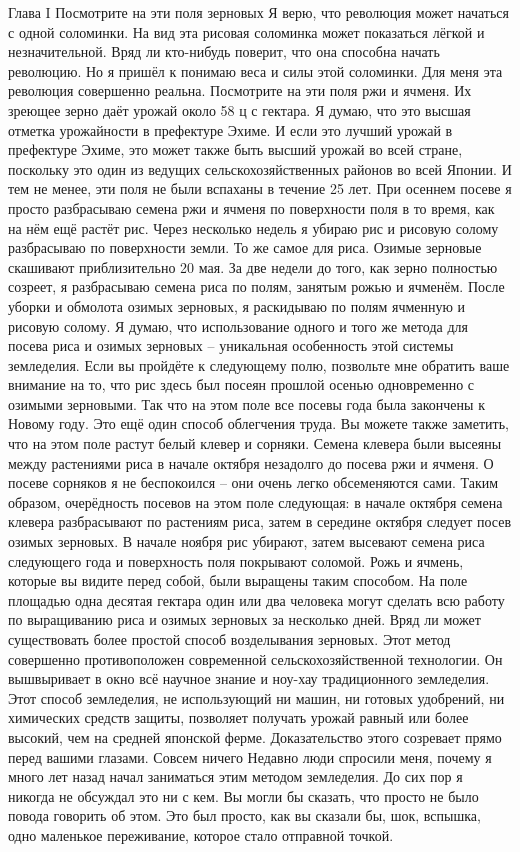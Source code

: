 \documentclass[a4paper]{book}
\begin{document}
Глава I Посмотрите на эти поля зерновых
Я верю, что революция может начаться с одной соломинки. На вид эта рисовая
соломинка может показаться лёгкой и незначительной. Вряд ли кто-нибудь поверит, что она
способна начать революцию. Но я пришёл к понимаю веса и силы этой соломинки. Для меня
эта революция совершенно реальна.
Посмотрите на эти поля ржи и ячменя. Их зреющее зерно даёт урожай около 58 ц с
гектара. Я думаю, что это высшая отметка урожайности в префектуре Эхиме. И если это
лучший урожай в префектуре Эхиме, это может также быть высший урожай во всей стране,
поскольку это один из ведущих сельскохозяйственных районов во всей Японии. И тем не
менее, эти поля не были вспаханы в течение 25 лет.
При осеннем посеве я просто разбрасываю семена ржи и ячменя по поверхности поля в
то время, как на нём ещё растёт рис. Через несколько недель я убираю рис и рисовую солому
разбрасываю по поверхности земли.
То же самое для риса. Озимые зерновые скашивают приблизительно 20 мая. За две
недели до того, как зерно полностью созреет, я разбрасываю семена риса по полям, занятым
рожью и ячменём. После уборки и обмолота озимых зерновых, я раскидываю по полям
ячменную и рисовую солому.
Я думаю, что использование одного и того же метода для посева риса и озимых
зерновых – уникальная особенность этой системы земледелия. Если вы пройдёте к
следующему полю, позвольте мне обратить ваше внимание на то, что рис здесь был посеян
прошлой осенью одновременно с озимыми зерновыми. Так что на этом поле все посевы года
была закончены к Новому году. Это ещё один способ облегчения труда.
Вы можете также заметить, что на этом поле растут белый клевер и сорняки. Семена
клевера были высеяны между растениями риса в начале октября незадолго до посева ржи и
ячменя. О посеве сорняков я не беспокоился – они очень легко обсеменяются сами.
Таким образом, очерёдность посевов на этом поле следующая: в начале октября семена
клевера разбрасывают по растениям риса, затем в середине октября следует посев озимых
зерновых. В начале ноября рис убирают, затем высевают семена риса следующего года и
поверхность поля покрывают соломой. Рожь и ячмень, которые вы видите перед собой, были
выращены таким способом.
На поле площадью одна десятая гектара один или два человека могут сделать всю
работу по выращиванию риса и озимых зерновых за несколько дней. Вряд ли может
существовать более простой способ возделывания зерновых.
Этот метод совершенно противоположен современной сельскохозяйственной
технологии. Он вышвыривает в окно всё научное знание и ноу-хау традиционного
земледелия. Этот способ земледелия, не использующий ни машин, ни готовых удобрений, ни
химических средств защиты, позволяет получать урожай равный или более высокий, чем на
средней японской ферме. Доказательство этого созревает прямо перед вашими глазами.
Совсем ничего
Недавно люди спросили меня, почему я много лет назад начал заниматься этим методом
земледелия. До сих пор я никогда не обсуждал это ни с кем. Вы могли бы сказать, что просто
не было повода говорить об этом. Это был просто, как вы сказали бы, шок, вспышка, одно
маленькое переживание, которое стало отправной точкой.
\end{document}
